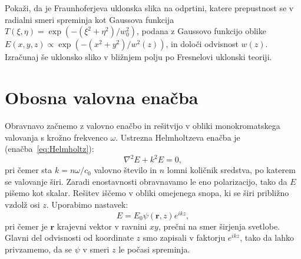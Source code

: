 \begin{naloga}
\label{ffuklon}
Pokaži, da je Fraunhoferjeva uklonska slika na odprtini, katere prepustnost se v radialni smeri
spreminja kot Gaussova funkcija $T(\xi, \eta)=\exp(-(\xi^2+\eta^2)/w_0^2)$, podana z Gaussovo funkcijo
oblike $E(x,y,z) \propto \exp(-(x^2+y^2)/w^2(z))$, in določi odvisnost $w(z)$. Izračunaj še 
uklonsko sliko v bližnjem polju po Fresnelovi uklonski teoriji.
\end{naloga}

\section{Obosna valovna enačba}
Obravnavo začnemo z valovno enačbo in rešitvijo v obliki monokromatskega valovanja 
s krožno frekvenco $\omega$. Ustrezna
Helmholtzeva enačba je (enačba~\ref{eq:Helmholtz}):
\begin{equation}
\nabla^{2}E+k^{2}E=0,
\label{eq:valovna-enacba-hh}
\end{equation}
pri čemer sta $k=n\omega/c_{0}$ valovno število in $n$ lomni količnik
sredstva, po katerem se valovanje širi. Zaradi enostavnosti obravnavamo
le eno polarizacijo, tako da $E$ pišemo kot skalar. Rešitev iščemo v obliki
omejenega snopa, ki se širi približno vzdolž osi $z$. Uporabimo nastavek:
\begin{equation}
E=E_{0}\psi(\mathbf{r},z)e^{ikz},
\label{eq:ravni-val-nastavek}
\end{equation}
pri čemer je $\mathbf{r}$ krajevni vektor v ravnini $xy$, prečni na smer širjenja svetlobe. 
Glavni del odvisnosti od koordinate $z$ smo zapisali v faktorju $e^{ikz}$, tako da lahko
privzamemo, da se $\psi$ v smeri $z$ le počasi spreminja. 

